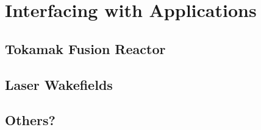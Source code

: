 \section{Interfacing with Applications}

\subsection{Tokamak Fusion Reactor}

\subsection{Laser Wakefields}

\subsection{Others?}
